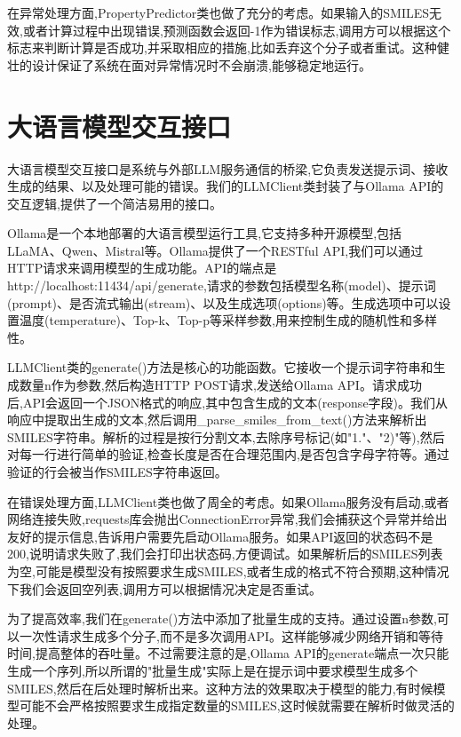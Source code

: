 在异常处理方面,PropertyPredictor类也做了充分的考虑。如果输入的SMILES无效,或者计算过程中出现错误,预测函数会返回-1作为错误标志,调用方可以根据这个标志来判断计算是否成功,并采取相应的措施,比如丢弃这个分子或者重试。这种健壮的设计保证了系统在面对异常情况时不会崩溃,能够稳定地运行。

\section{大语言模型交互接口}

大语言模型交互接口是系统与外部LLM服务通信的桥梁,它负责发送提示词、接收生成的结果、以及处理可能的错误。我们的LLMClient类封装了与Ollama API的交互逻辑,提供了一个简洁易用的接口。

Ollama是一个本地部署的大语言模型运行工具,它支持多种开源模型,包括LLaMA、Qwen、Mistral等。Ollama提供了一个RESTful API,我们可以通过HTTP请求来调用模型的生成功能。API的端点是http://localhost:11434/api/generate,请求的参数包括模型名称(model)、提示词(prompt)、是否流式输出(stream)、以及生成选项(options)等。生成选项中可以设置温度(temperature)、Top-k、Top-p等采样参数,用来控制生成的随机性和多样性。

LLMClient类的generate()方法是核心的功能函数。它接收一个提示词字符串和生成数量n作为参数,然后构造HTTP POST请求,发送给Ollama API。请求成功后,API会返回一个JSON格式的响应,其中包含生成的文本(response字段)。我们从响应中提取出生成的文本,然后调用\_parse\_smiles\_from\_text()方法来解析出SMILES字符串。解析的过程是按行分割文本,去除序号标记(如"1."、"2)"等),然后对每一行进行简单的验证,检查长度是否在合理范围内,是否包含字母字符等。通过验证的行会被当作SMILES字符串返回。

在错误处理方面,LLMClient类也做了周全的考虑。如果Ollama服务没有启动,或者网络连接失败,requests库会抛出ConnectionError异常,我们会捕获这个异常并给出友好的提示信息,告诉用户需要先启动Ollama服务。如果API返回的状态码不是200,说明请求失败了,我们会打印出状态码,方便调试。如果解析后的SMILES列表为空,可能是模型没有按照要求生成SMILES,或者生成的格式不符合预期,这种情况下我们会返回空列表,调用方可以根据情况决定是否重试。

为了提高效率,我们在generate()方法中添加了批量生成的支持。通过设置n参数,可以一次性请求生成多个分子,而不是多次调用API。这样能够减少网络开销和等待时间,提高整体的吞吐量。不过需要注意的是,Ollama API的generate端点一次只能生成一个序列,所以所谓的"批量生成"实际上是在提示词中要求模型生成多个SMILES,然后在后处理时解析出来。这种方法的效果取决于模型的能力,有时候模型可能不会严格按照要求生成指定数量的SMILES,这时候就需要在解析时做灵活的处理。

